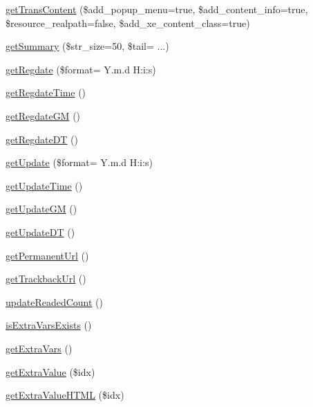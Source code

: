 \begin{DoxyCompactItemize}
\item 
\hyperlink{classdocumentItem_a3143f575cb788ed2317b5697768a6a6f}{get\+Trans\+Content} (\$add\+\_\+popup\+\_\+menu=true, \$add\+\_\+content\+\_\+info=true, \$resource\+\_\+realpath=false, \$add\+\_\+xe\+\_\+content\+\_\+class=true)
\item 
\hyperlink{classdocumentItem_ae79665f63d15ecaeb114d32f1ef37256}{get\+Summary} (\$str\+\_\+size=50, \$tail= \textquotesingle{}...\textquotesingle{})
\item 
\hyperlink{classdocumentItem_af648c02eaaf148c374a7bfcdd968ff92}{get\+Regdate} (\$format= \textquotesingle{}Y.\+m.\+d H\+:i\+:s\textquotesingle{})
\item 
\hyperlink{classdocumentItem_ac5d8db0250cc8f448d9a76aaa3afa953}{get\+Regdate\+Time} ()
\item 
\hyperlink{classdocumentItem_a7bd6f9adea145314a87c95b13f6e0bd7}{get\+Regdate\+G\+M} ()
\item 
\hyperlink{classdocumentItem_a30f4ec669361717a82e5dee9c9b3868f}{get\+Regdate\+D\+T} ()
\item 
\hyperlink{classdocumentItem_acdd6ff630a1cc11f2d664fdec740ae0c}{get\+Update} (\$format= \textquotesingle{}Y.\+m.\+d H\+:i\+:s\textquotesingle{})
\item 
\hyperlink{classdocumentItem_a026c6426bea71f9ab86a4f4a7dcff6d9}{get\+Update\+Time} ()
\item 
\hyperlink{classdocumentItem_a6bb6ee1c20e63af811ebd2c6993e898f}{get\+Update\+G\+M} ()
\item 
\hyperlink{classdocumentItem_a05139ae1f3934a4db14e4d73b504f534}{get\+Update\+D\+T} ()
\item 
\hyperlink{classdocumentItem_a8583e18888f4ad634ec23c7cd85dc172}{get\+Permanent\+Url} ()
\item 
\hyperlink{classdocumentItem_a38db599ef3ca4f789475d7e8cceb13da}{get\+Trackback\+Url} ()
\item 
\hyperlink{classdocumentItem_ac268c88d87f12155e5885510213028e3}{update\+Readed\+Count} ()
\item 
\hyperlink{classdocumentItem_ac51058096d79221c90595564e3dbdb82}{is\+Extra\+Vars\+Exists} ()
\item 
\hyperlink{classdocumentItem_afe41c70dfb21cc8b8d397a3af24eb895}{get\+Extra\+Vars} ()
\item 
\hyperlink{classdocumentItem_a5b0cd52819bcb058a7e8a6764aef79d1}{get\+Extra\+Value} (\$idx)
\item 
\hyperlink{classdocumentItem_a0100c3b24a5c4b75b0edc1bfd139e77a}{get\+Extra\+Value\+H\+T\+M\+L} (\$idx)

\end{DoxyCompactItemize}
